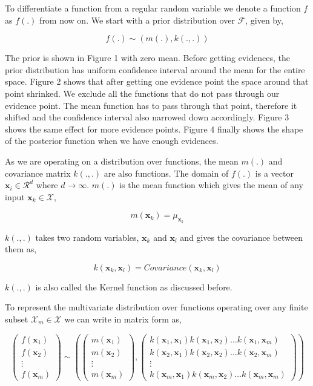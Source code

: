\documentclass[english]{tktltiki}
\begin{document}
To differentiate a function from a regular random variable we denote a function $f$ as $f(.)$ from now on. We start with a prior distribution over $\mathcal{F}$, given by,

\begin{equation}
f(.) \sim (m(.), k(.,.))
\end{equation}

The prior is shown in Figure 1 with zero mean. Before getting evidences, the prior distribution has uniform confidence interval around the mean for the entire space. Figure 2 shows that after getting one evidence point the space around that point shrinked. We exclude all the functions that do not pass through our evidence point. The mean function has to pass through that point, therefore it shifted and the confidence interval also narrowed down accordingly. Figure 3 shows the same effect for more evidence points. Figure 4 finally shows the shape of the posterior function when we have enough evidences.

As we are operating on a distribution over functions, the mean $m(.)$ and covariance matrix $k(.,.)$ are also functions. The domain of $f(.)$ is a vector $\mathbf{x}_i \in \mathcal{R}^d$ where $d \to \infty$. $m(.)$ is the mean function which gives the mean of any input $\mathbf{x}_k \in \mathcal{X}$,

$$
m(\mathbf{x}_k) = \mu_{\mathbf{x}_k}
$$

$k(.,.)$ takes two random variables, $\mathbf{x}_k$ and $\mathbf{x}_l$ and gives the covariance between them as,

$$
k(\mathbf{x}_k, \mathbf{x}_l) = Covariance(\mathbf{x}_k, \mathbf{x}_l)
$$

$k(.,.)$ is also called the Kernel function as discussed before.

To represent the multivariate distribution over functions operating over any finite subset $\mathcal{X}_m \in \mathcal{X}$ we can write in matrix form as,

$$
\begin{pmatrix}
f(\mathbf{x}_1) \\
f(\mathbf{x}_2) \\
\vdots \\
f(\mathbf{x}_m)
\end{pmatrix}
\sim\left(%
\begin{pmatrix}
m(\mathbf{x}_1) \\
m(\mathbf{x}_2) \\
\vdots \\
m(\mathbf{x}_m)
\end{pmatrix}
,%
\begin{pmatrix}
k(\mathbf{x}_1, \mathbf{x}_1) k(\mathbf{x}_1, \mathbf{x}_2) \hdots k(\mathbf{x}_1, \mathbf{x}_m) \\
k(\mathbf{x}_2, \mathbf{x}_1) k(\mathbf{x}_2, \mathbf{x}_2) \hdots k(\mathbf{x}_2, \mathbf{x}_m) \\
\vdots \\
k(\mathbf{x}_m, \mathbf{x}_1) k(\mathbf{x}_m, \mathbf{x}_2) \hdots k(\mathbf{x}_m, \mathbf{x}_m) 
\end{pmatrix}\right)
$$
\end{document}
